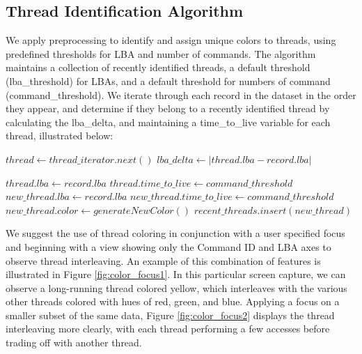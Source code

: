 \documentclass[12pt]{ucthesis}
\begin{document}
\subsection{Thread Identification Algorithm}
We apply preprocessing to identify and assign unique colors to threads, using predefined thresholds for LBA and number of commands. The algorithm maintains a collection of recently identified threads, a default threshold (lba\_threshold) for LBAs, and a default threshold for numbers of command (command\_threshold). We iterate through each record in the dataset in the order they appear, and determine if they belong to a recently identified thread by calculating the lba\_delta, and maintaining a time\_to\_live variable for each thread, illustrated below:

\begin{algorithmic}
    \STATE{}
      \STATE $thread \gets thread\_iterator.next()$
      \STATE $lba\_delta\gets |thread.lba - record.lba|$
    \ENDWHILE


     \STATE{}
        \STATE $thread.lba \gets record.lba$
        \STATE $thread.time\_to\_live \gets command\_threshold$
    \ELSE \STATE{}
      \STATE $new\_thread.lba \gets record.lba$
      \STATE $new\_thread.time\_to\_live \gets command\_threshold$
      \STATE $new\_thread.color \gets generateNewColor()$
      \STATE $recent\_threads.insert(new\_thread) $
    \ENDIF


\ENDFOR
\end{algorithmic}

We suggest the use of thread coloring in conjunction with a user specified focus and beginning with a view showing only the Command ID and LBA axes to observe thread interleaving. An example of this combination of features is illustrated in Figure \ref{fig:color_focus1}. In this particular screen capture, we can observe a long-running thread colored yellow, which interleaves with the various other threads colored with hues of red, green, and blue. Applying a focus on a smaller subset of the same data, Figure \ref{fig:color_focus2} displays the thread interleaving more clearly, with each thread performing a few accesses before trading off with another thread.
\end{document}
